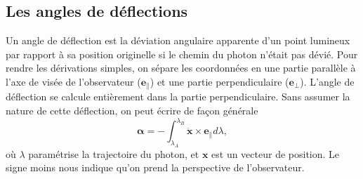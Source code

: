 \subsection{Les angles de déflections}
Un angle de déflection est la déviation angulaire apparente d'un point 
lumineux par rapport à sa position originelle si 
le chemin du photon n'était pas dévié. Pour rendre les dérivations simples, 
on sépare les coordonnées en une partie parallèle à l'axe de visée de l'observateur ($\mathbf{e}_\parallel$) 
et une partie perpendiculaire ($\mathbf{e}_\perp$). L'angle de déflection se calcule entièrement 
dans la partie perpendiculaire. Sans assumer la nature de cette déflection, 
on peut écrire de façon générale
\begin{equation}\label{eq:alpha}
        \boldsymbol{ \alpha} = - \int_{\lambda_A}^{\lambda_B} \ddot{\mathbf{x}} \times \mathbf{e}_{\parallel} d\lambda,
\end{equation}
où $\lambda$ paramétrise la trajectoire du photon, et $\mathbf{x}$ est un vecteur de 
position. Le signe moins nous indique qu'on prend la perspective de l'observateur. 

